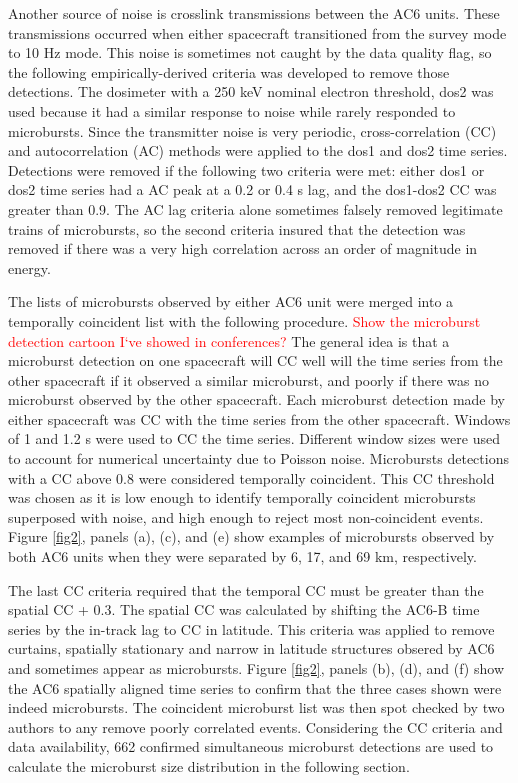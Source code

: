 \documentclass[draft]{agujournal2019}
\begin{document}
Another source of noise is crosslink transmissions between the AC6 units. These transmissions occurred when either spacecraft transitioned from the survey mode to 10 Hz mode. This noise is sometimes not caught by the data quality flag, so the following empirically-derived criteria was developed to remove those detections. The dosimeter with a 250 keV nominal electron threshold, dos2 was used because it had a similar response to noise while rarely responded to microbursts. Since the transmitter noise is very periodic, cross-correlation (CC) and autocorrelation (AC) methods were applied to the dos1 and dos2 time series. Detections were removed if the following two criteria were met: either dos1 or dos2 time series had a AC peak at a 0.2 or 0.4 s lag, and the dos1-dos2 CC was greater than 0.9. The AC lag criteria alone sometimes falsely removed legitimate trains of microbursts, so the second criteria insured that the detection was removed if there was a very high correlation across an order of magnitude in energy.

The lists of microbursts observed by either AC6 unit were merged into a temporally coincident list with the following procedure. \textcolor{red}{Show the microburst detection cartoon I`ve showed in conferences?} The general idea is that a microburst detection on one spacecraft will CC well will the time series from the other spacecraft if it observed a similar microburst, and poorly if there was no microburst observed by the other spacecraft. Each microburst detection made by either spacecraft was CC with the time series from the other spacecraft. Windows of 1 and 1.2 s were used to CC the time series. Different window sizes were used to account for numerical uncertainty due to Poisson noise. Microbursts detections with a CC above 0.8 were considered temporally coincident. This CC threshold was chosen as it is low enough to identify temporally coincident microbursts superposed with noise, and high enough to reject most non-coincident events. Figure \ref{fig2}, panels (a), (c), and (e) show examples of microbursts observed by both AC6 units when they were separated by 6, 17, and 69 km, respectively. 

The last CC criteria required that the temporal CC must be greater than the spatial CC + 0.3. The spatial CC was calculated by shifting the AC6-B time series by the in-track lag to CC in latitude. This criteria was applied to remove curtains, spatially stationary and narrow in latitude structures obsered by AC6 \cite{Blake2016} and sometimes appear as microbursts. Figure \ref{fig2}, panels (b), (d), and (f) show the AC6 spatially aligned time series to confirm that the three cases shown were indeed microbursts. The coincident microburst list was then spot checked by two authors to any remove poorly correlated events. Considering the CC criteria and data availability, 662 confirmed simultaneous microburst detections are used to calculate the microburst size distribution in the following section.
\end{document}
